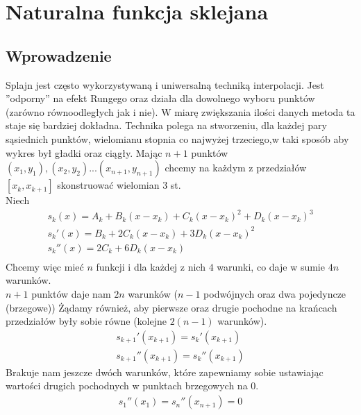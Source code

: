 \documentclass[paper=a4, fontsize=11pt]{scrartcl} %
\numberwithin{equation}{section} %
\numberwithin{figure}{section} %
\numberwithin{table}{section} %
\begin{document}
\section{Naturalna funkcja sklejana}
\subsection{Wprowadzenie}
Splajn jest często wykorzystywaną i uniwersalną techniką interpolacji. Jest ''odporny'' na efekt Rungego oraz działa dla dowolnego wyboru punktów (zarówno równoodległych jak i nie). W miarę zwiększania ilości danych metoda ta staje się bardziej dokładna. Technika polega na stworzeniu, dla każdej pary sąsiednich punktów, wielomianu stopnia co najwyżej trzeciego,w taki sposób aby wykres był gładki oraz ciągły.
\medbreak
Mając $n+1$ punktów $(x_{1},y_{1}), (x_{2},y_{2}) ... (x_{n+1}, y_{n+1})$ chcemy na każdym z przedziałów $[x_{k}, x_{k+1}]$ skonstruować wielomian $3$ st. \\
Niech
\begin{gather}
 s_{k}(x) = A_{k} + B_{k}(x - x_{k}) + C_{k}(x - x_{k})^{2} + D_{k}(x - x_{k})^{3} \\
 s_{k}'(x) = B_{k} + 2C_{k}(x - x_{k}) + 3D_{k}(x - x_{k})^{2} \\
 s_{k}''(x) = 2C_{k}+ 6D_{k}(x - x_{k}) \\
\end{gather}
Chcemy więc mieć $n$ funkcji i dla każdej z nich $4$ warunki, co daje w sumie $4n$ warunków. \\
$n+1$ punktów daje nam $2n$ warunków ($n-1$ podwójnych oraz dwa pojedyncze (brzegowe))
Żądamy również, aby pierwsze oraz drugie pochodne na krańcach przedziałów były sobie równe (kolejne $2(n-1)$ warunków).
\begin{align}
s_{k+1}'(x_{k+1}) = s_{k}'(x_{k+1}) \\
s_{k+1}''(x_{k+1}) = s_{k}''(x_{k+1})
\end{align}
Brakuje nam jeszcze dwóch warunków, które zapewniamy sobie ustawiając wartości drugich pochodnych w punktach brzegowych na $0$.
\begin{align}
s_{1}''(x_{1}) = s_{n}''(x_{n+1}) = 0
\end{align}
\end{document}
